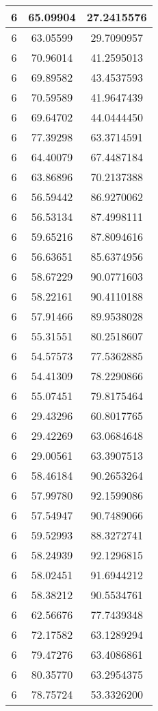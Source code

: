 \documentclass[
]{book}
\begin{document}
\begin{tabular}{c|c|c}
\hline
6 & 65.09904 & 27.2415576\\
\hline
6 & 63.05599 & 29.7090957\\
\hline
6 & 70.96014 & 41.2595013\\
\hline
6 & 69.89582 & 43.4537593\\
\hline
6 & 70.59589 & 41.9647439\\
\hline
6 & 69.64702 & 44.0444450\\
\hline
6 & 77.39298 & 63.3714591\\
\hline
6 & 64.40079 & 67.4487184\\
\hline
6 & 63.86896 & 70.2137388\\
\hline
6 & 56.59442 & 86.9270062\\
\hline
6 & 56.53134 & 87.4998111\\
\hline
6 & 59.65216 & 87.8094616\\
\hline
6 & 56.63651 & 85.6374956\\
\hline
6 & 58.67229 & 90.0771603\\
\hline
6 & 58.22161 & 90.4110188\\
\hline
6 & 57.91466 & 89.9538028\\
\hline
6 & 55.31551 & 80.2518607\\
\hline
6 & 54.57573 & 77.5362885\\
\hline
6 & 54.41309 & 78.2290866\\
\hline
6 & 55.07451 & 79.8175464\\
\hline
6 & 29.43296 & 60.8017765\\
\hline
6 & 29.42269 & 63.0684648\\
\hline
6 & 29.00561 & 63.3907513\\
\hline
6 & 58.46184 & 90.2653264\\
\hline
6 & 57.99780 & 92.1599086\\
\hline
6 & 57.54947 & 90.7489066\\
\hline
6 & 59.52993 & 88.3272741\\
\hline
6 & 58.24939 & 92.1296815\\
\hline
6 & 58.02451 & 91.6944212\\
\hline
6 & 58.38212 & 90.5534761\\
\hline
6 & 62.56676 & 77.7439348\\
\hline
6 & 72.17582 & 63.1289294\\
\hline
6 & 79.47276 & 63.4086861\\
\hline
6 & 80.35770 & 63.2954375\\
\hline
6 & 78.75724 & 53.3326200\\

\end{tabular}
\end{document}
